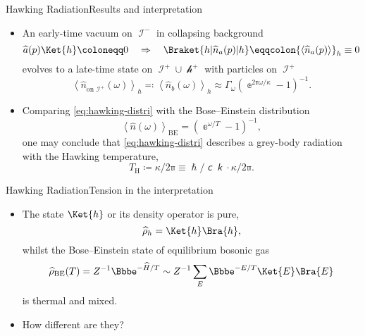 \documentclass{beamer}
\newcommand{\ee}{{\Bbbe}}
\newcommand{\pp}{{\Bbbpi}}
\newcommand{\lc}{\mitsansc} %
\newcommand{\bk}{\mitsansk} %
\newcommand{\phs}{\hslash} %
\newcommand{\rbr}[1]{{\left(#1\right)}}
\newcommand{\abr}[1]{{\left<#1\right>}}
\newcommand{\rfun}[2]{{#1}\mathopen{}\left(#2\right)\mathclose{}}
\newcommand{\what}[1]{{\widehat{#1}}}
\begin{document}
\begin{frame}{Hawking Radiation}{Results and interpretation 
\cite{HAWKING1974,Hawking1975}}

\begin{itemize}
\item An early-time \alert{vacuum} on $\mscrI^-$ in collapsing background
\begin{equation}
\rfun{\what{a}}{p}\Ket{h} \coloneqq 0\quad\Rightarrow\quad
\Braket{h | \rfun{\what{n}_a}{p} | h} \eqqcolon \abr{\rfun{\what{n}_a}{p}}_h 
\equiv 0
\end{equation}
evolves to a late-time state on $\mscrI^+\cup\mscrh^+$ \alert{with particles} 
on $\mscrI^+$
\begin{equation}
\abr{\rfun{\what{n}_{\text{on }\mscrI^+}}{\omega}}_h \eqqcolon
\abr{\rfun{\what{n}_b}{\omega}}_h \approx
\Gamma_\omega\rbr{\ee^{2\pp\omega/\kappa}-1}^{-1}.
\label{eq:hawking-distri}
\end{equation}
\item Comparing \cref{eq:hawking-distri} with the Bose--Einstein distribution
\begin{equation}
\abr{\rfun{\what{n}}{\omega}}_\text{BE} = \rbr{\ee^{\omega/T} - 1}^{-1}, 
\end{equation}
one may conclude that \cref{eq:hawking-distri} describes a grey-body
radiation with the \alert{Hawking temperature},
\begin{equation}
T_\text{H} \coloneqq \kappa/2\pp \equiv \phs/\lc\bk \cdot \kappa/2\pp.
\end{equation}

\end{itemize}

\end{frame}


\begin{frame}{Hawking Radiation}{Tension in the interpretation}
\begin{itemize}
\item The state $\Ket{h}$ or its density operator is \alert{pure},
\begin{equation}
\what{\rho}_h = \Ket{h}\Bra{h},
\end{equation}
whilst the Bose--Einstein state of equilibrium bosonic gas
\begin{equation}
\rfun{\what{\rho}_\text{BE}}{T} = {Z}^{-1} \ee^{-\what{H}/T}
\sim Z^{-1} \sum_E \ee^{-E/T} \Ket{E}\Bra{E}
\end{equation}
is \alert{thermal} and \alert{mixed}.
\item How different are they? \cite{Kiefer2001,Hsu2009}
\end{itemize}
\end{frame}
\end{document}
